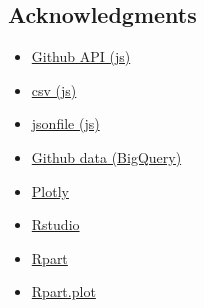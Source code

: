 \documentclass[11pt]{article}
\providecommand{\tightlist}{%
      \setlength{\itemsep}{0pt}\setlength{\parskip}{0pt}}
\begin{document}
    \hypertarget{acknowledgments}{%
\subsection{Acknowledgments}\label{acknowledgments}}

\begin{itemize}
\tightlist
\item
  \href{https://github.com/octokit/rest.js}{Github API (js)}
\item
  \href{https://www.npmjs.com/package/csv}{csv (js)}
\item
  \href{https://www.npmjs.com/package/jsonfile}{jsonfile (js)}
\item
  \href{https://bigquery.cloud.google.com/dataset/bigquery-public-data:github_repos}{Github
  data (BigQuery)}
\item
  \href{https://plot.ly/python/}{Plotly}
\item
  \href{https://www.rstudio.com/}{Rstudio}
\item
  \href{https://cran.r-project.org/web/packages/rpart/index.html}{Rpart}
\item
  \href{https://cran.r-project.org/web/packages/rpart.plot/index.html}{Rpart.plot}
\end{itemize}


    
    
    
    
\end{document}
